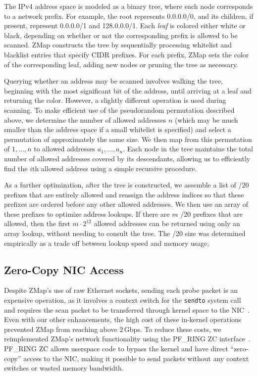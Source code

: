 The IPv4 address space is modeled as a binary tree, where each node
corresponds to a network prefix. For example, the root represents 0.0.0.0/0,
and its children, if present, represent 0.0.0.0/1 and 128.0.0.0/1. Each
\emph{leaf} is colored either white or black, depending on whether or not the
corresponding prefix is allowed to be scanned. ZMap constructs the tree by
sequentially processing whitelist and blacklist entries that specify CIDR
prefixes. For each prefix, ZMap sets the color of the corresponding leaf,
adding new nodes or pruning the tree as necessary.

Querying whether an address may be scanned involves walking the tree,
beginning with the most significant bit of the address, until arriving at a
leaf and returning the color. However, a slightly different operation is used
during scanning. To make efficient use of the pseudorandom permutation
described above, we determine the number of allowed addresses $n$ (which may
be much smaller than the address space if a small whitelist is specified) and
select a permutation of approximately the same size. We then map from this
permutation of $1,\ldots,n$ to allowed addresses $a_1,\ldots,a_n$. Each node
in the tree maintains the total number of allowed addresses covered by its
descendants, allowing us to efficiently find the $i$th allowed address using
a simple recursive procedure.
 
As a further optimization, after the tree is constructed, we assemble a list
of /20 prefixes that are entirely allowed and reassign the address indices so
that these prefixes are ordered before any other allowed addresses. We then
use an array of these prefixes to optimize address lookups. If there are $m$
/20 prefixes that are allowed, then the first $m\cdot2^{12}$ allowed
addresses can be returned using only an array lookup, without needing to
consult the tree. The /20 size was determined empirically as a trade off
between lookup speed and memory usage.
 
\subsection{Zero-Copy NIC Access}
\label{sec:zc}
 
Despite ZMap's use of raw Ethernet sockets, sending each probe packet is an
expensive operation, as it involves a context switch for the \texttt{sendto}
system call and requires the scan packet to be transferred through kernel
space to the NIC~\cite{pfring-2004, ten-gig-commodity}. Even with our
other enhancements, the high cost of these in-kernel operations prevented
ZMap from reaching above 2\,Gbps. To reduce these costs, we reimplemented
ZMap's network functionality using the PF\_RING ZC
interface~\cite{pfring-zc}. PF\_RING ZC allows userspace code to bypass the
kernel and have direct ``zero-copy'' access to the NIC\@, making it possible
to send packets without any context switches or wasted memory bandwidth.
 
